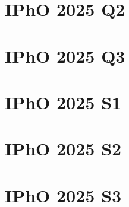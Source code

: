 \documentclass[12pt]{article}
\begin{document}
\section{IPhO 2025 Q2}

\section{IPhO 2025 Q3}  

\section{IPhO 2025 S1}

\section{IPhO 2025 S2}

\section{IPhO 2025 S3}

\end{document}
